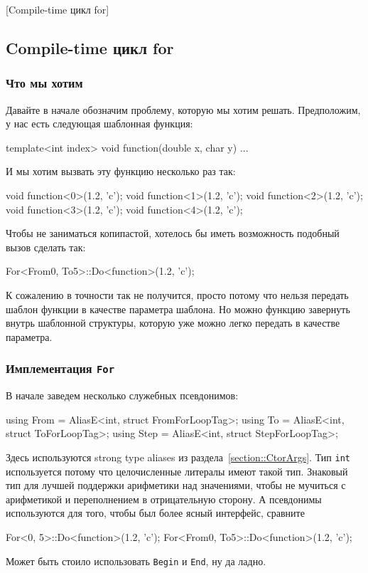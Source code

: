 [Compile-time цикл for]


\subsection{Compile-time цикл for}

\subsubsection{Что мы хотим}

Давайте в начале обозначим проблему, которую мы хотим решать.
Предположим, у нас есть следующая шаблонная функция:
\begin{cppcode}
template<int index>
void function(double x, char y) {...}
\end{cppcode}
И мы хотим вызвать эту функцию несколько раз так:
\begin{cppcode}
void function<0>(1.2, 'c');
void function<1>(1.2, 'c');
void function<2>(1.2, 'c');
void function<3>(1.2, 'c');
void function<4>(1.2, 'c');
\end{cppcode}
Чтобы не заниматься копипастой, хотелось бы иметь возможность подобный вызов сделать так:
\begin{cppcode}
For<From{0}, To{5}>::Do<function>(1.2, 'c');
\end{cppcode}
К сожалению в точности так не получится, просто потому что нельзя передать шаблон функции в качестве параметра шаблона.
Но можно функцию завернуть внутрь шаблонной структуры, которую уже можно легко передать в качестве параметра.

\subsubsection{Имплементация \texttt{For}}

В начале заведем несколько служебных псевдонимов:
\begin{cppcode}
using From = AliasE<int, struct FromForLoopTag>;
using To = AliasE<int, struct ToForLoopTag>;
using Step = AliasE<int, struct StepForLoopTag>;
\end{cppcode}
Здесь используются strong type aliases из раздела~\ref{section::CtorArgs}.
Тип \verb"int" используется потому что целочисленные литералы имеют такой тип.
Знаковый тип для лучшей поддержки арифметики над значениями, чтобы не мучиться с арифметикой и переполнением в отрицательную сторону.
А псевдонимы используются для того, чтобы был более ясный интерфейс, сравните
\begin{cppcode}
For<0, 5>::Do<function>(1.2, 'c');
For<From{0}, To{5}>::Do<function>(1.2, 'c');
\end{cppcode}
Может быть стоило использовать \verb"Begin" и \verb"End", ну да ладно.

